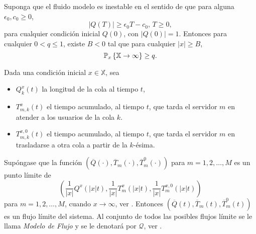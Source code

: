 \begin{Teo}\label{Tma2.2.Down}
Suponga que el fluido modelo es inestable en el sentido de que
para alguna $\epsilon_{0},c_{0}\geq0$,
\begin{equation}\label{Eq.Inestability}
|Q\left(T\right)|\geq\epsilon_{0}T-c_{0}\textrm{,   }T\geq0,
\end{equation}
para cualquier condici\'on inicial $Q\left(0\right)$, con
$|Q\left(0\right)|=1$. Entonces para cualquier $0<q\leq1$, existe
$B<0$ tal que para cualquier $|x|\geq B$,
\begin{equation}
\mathbb{P}_{x}\left\{\mathbb{X}\rightarrow\infty\right\}\geq q.
\end{equation}
\end{Teo}

Dada una condici\'on inicial $x\in\mathbb{X}$, sea

\begin{itemize}
\item $Q_{k}^{x}\left(t\right)$ la longitud de la cola al tiempo
$t$,

\item $T_{m,k}^{x}\left(t\right)$ el tiempo acumulado, al tiempo
$t$, que tarda el servidor $m$ en atender a los usuarios de la
cola $k$.

\item $T_{m,k}^{x,0}\left(t\right)$ el tiempo acumulado, al tiempo
$t$, que tarda el servidor $m$ en trasladarse a otra cola a partir de la $k$-\'esima.\\
\end{itemize}

Sup\'ongase que la funci\'on
$\left(\overline{Q}\left(\cdot\right),\overline{T}_{m}
\left(\cdot\right),\overline{T}_{m}^{0} \left(\cdot\right)\right)$
para $m=1,2,\ldots,M$ es un punto l\'imite de
\begin{equation}\label{Eq.Punto.Limite}
\left(\frac{1}{|x|}Q^{x}\left(|x|t\right),\frac{1}{|x|}T_{m}^{x}\left(|x|t\right),\frac{1}{|x|}T_{m}^{x,0}\left(|x|t\right)\right)
\end{equation}
para $m=1,2,\ldots,M$, cuando $x\rightarrow\infty$, ver
\cite{Down}. Entonces
$\left(\overline{Q}\left(t\right),\overline{T}_{m}
\left(t\right),\overline{T}_{m}^{0} \left(t\right)\right)$ es un
flujo l\'imite del sistema. Al conjunto de todos las posibles
flujos l\'imite se le llama {\emph{Modelo de Flujo}} y se le
denotar\'a por $\mathcal{Q}$, ver \cite{Down, Dai, DaiSean}.\\

